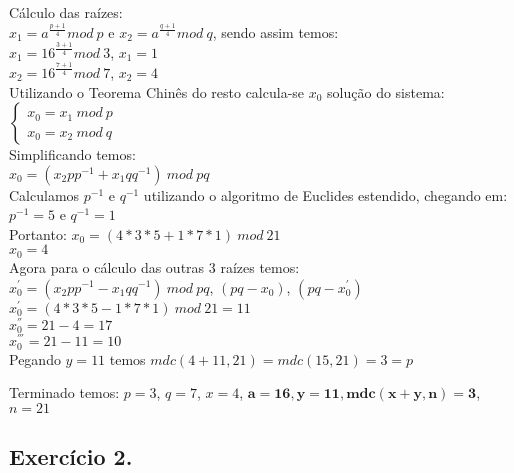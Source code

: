 \documentclass[12pt]{article}
\begin{document}
\begin{itemize}
\begin{center}
					Cálculo das raízes:\\
					$x_1 = a^{\frac{p+1}{4}} mod \ p$	e 
					$x_2 = a^{\frac{q+1}{4}} mod \ q$,
					sendo assim temos:\\
					$x_1 = 16^{\frac{3+1}{4}} mod \ 3$, $x_1 = 1$\\
					$x_2 = 16^{\frac{7+1}{4}} mod \ 7$, $x_2 = 4$\\
					Utilizando o Teorema Chinês do resto calcula-se $x_0$
					solução do sistema:
					$ \begin{cases} 
							x_0 = x_1 \ mod \ p \\ x_0 = x_2 \ mod \ q 
						\end{cases}
					$\\
					Simplificando temos:\\
					$x_0 = (x_2pp^{-1} + x_1qq^{-1}) \ mod \ pq$\\
					Calculamos $p^{-1}$ e $q^{-1}$ utilizando o algoritmo
					de Euclides estendido, chegando em:\\
					$p^{-1} = 5 $ e $q^{-1} = 1 $\\
					Portanto: $x_0 = (4*3*5 + 1*7*1) \ mod \ 21$\\
					$x_0 = 4$\\
					Agora para o cálculo das outras 3 raízes temos:\\
					$x_0^{'} = (x_2pp^{-1} - x_1qq^{-1}) \ mod \ pq$, $(pq - x_0)$,
					$(pq - x_0^{'})$\\
					$x_0^{'} = (4*3*5 - 1*7*1) \ mod \ 21 = 11$\\
					$x_0^{''} = 21 - 4 = 17$\\
					$x_0^{'''} = 21 - 11 = 10$\\
					Pegando $y = 11$ temos $mdc(4+11, 21) = mdc(15, 21) = 3 = p$				
				\end{center} 	
				Terminado temos: 
				$p = 3$, $q = 7$, $x = 4$, $\mathbf{a = 16, y = 11, mdc(x + y, n) = 3}$,
				$n = 21$
		\end{itemize}
	\subsection*{Exercício 2.}
\end{document}
